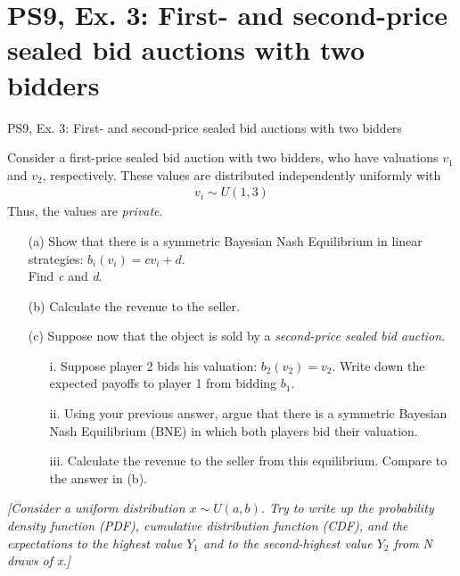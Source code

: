 \section{PS9, Ex. 3: First- and second-price sealed bid auctions with two bidders}

\begin{frame}{PS9, Ex. 3: First- and second-price sealed bid auctions with two bidders}
    \begin{multicols}{2}
      Consider a first-price sealed bid auction with two bidders, who have valuations $v_1$ and $v_2$, respectively. These values are distributed independently uniformly with
      \begin{align*}
        v_i\sim U(1,3)
      \end{align*}
      Thus, the values are \textit{private}.
      \begin{itemize}
        \item[(a)] Show that there is a symmetric Bayesian Nash Equilibrium in linear strategies: $b_i(v_i) = cv_i + d$.\\
                   Find \textit{c} and \textit{d}.
        \item[(b)] Calculate the revenue to the seller.
      \end{itemize}
      \vfill\null\columnbreak
      \begin{itemize}
        \item[(c)] Suppose now that the object is sold by a \textit{second-price sealed bid auction}.
        \begin{itemize}\normalsize
          \item[i.]   Suppose player 2 bids his valuation: $b_2(v_2) = v_2$. Write down the expected payoffs to player 1 from bidding $b_1$.
          \item[ii.]  Using your previous answer, argue that there is a symmetric Bayesian Nash Equilibrium (BNE) in which both players bid their valuation.
          \item[iii.] Calculate the revenue to the seller from this equilibrium. Compare to the answer in (b).
        \end{itemize}
      \end{itemize}
      \vfill\null
    \end{multicols}
    \vspace{-8pt}
    \textit{[Consider a uniform distribution $x\sim U(a, b)$. Try to write up the probability density function (PDF), cumulative distribution function (CDF), and the expectations to the highest value $Y_1$ and to the second-highest value $Y_2$ from N draws of x.]}
\end{frame}
